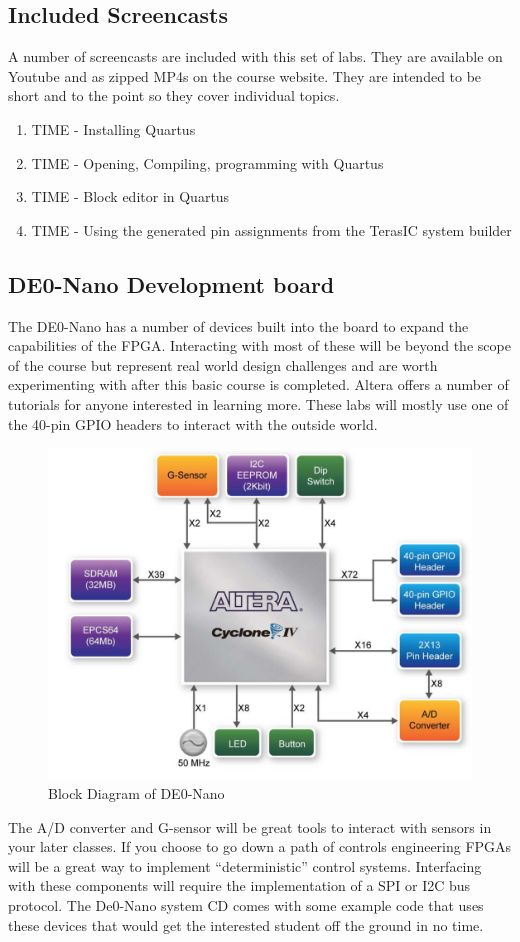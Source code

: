    \subsection{Included Screencasts}
      A number of screencasts are included with this set of labs. They are available on Youtube and as zipped MP4s on the course website. They are intended to be short and to the point so they cover individual topics.
      \begin{enumerate}
        \item TIME - Installing Quartus
        \item TIME - Opening, Compiling, programming with Quartus
        \item TIME - Block editor in Quartus
        \item TIME - Using the generated pin assignments from the TerasIC system builder
      \end{enumerate}

    \subsection{DE0-Nano Development board}
      The DE0-Nano has a number of devices built into the board to expand the capabilities of the FPGA. Interacting with most of these will be beyond the scope of the course but represent real world design challenges and are worth experimenting with after this basic course is completed. Altera offers a number of tutorials for anyone interested in learning more. These labs will mostly use one of the 40-pin GPIO headers to interact with the outside world. 
      \begin{figure}[htpb]
        \includegraphics[width=.48\textwidth]{Images/DEONanoBlockDiagram.png}
        \caption{Block Diagram of DE0-Nano \cite{DE0Manual}}
      \end{figure}
      The A/D converter and G-sensor will be great tools to interact with sensors in your later classes. If you choose to go down a path of controls engineering FPGAs will be a great way to implement ``deterministic'' control systems. Interfacing with these components will require the implementation of a SPI or I2C bus protocol. The De0-Nano system CD comes with some example code that uses these devices that would get the interested student off the ground in no time. 

